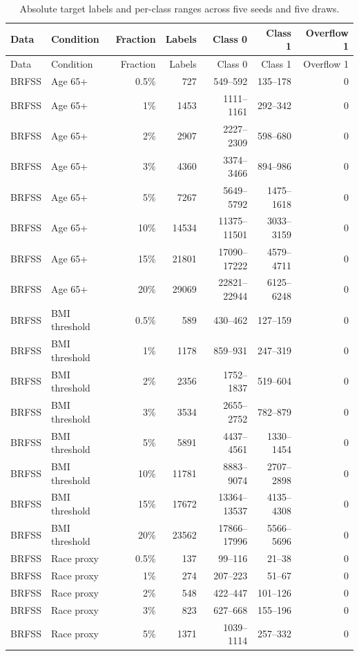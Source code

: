\begin{longtable}{llrrrrr}
\caption{Absolute target labels and per-class ranges across five seeds and five draws.}\\
\toprule Data & Condition & Fraction & Labels & Class 0 & Class 1 & Overflow 1 \\ \midrule\endfirsthead
\toprule Data & Condition & Fraction & Labels & Class 0 & Class 1 & Overflow 1 \\ \midrule\endhead
BRFSS & Age 65+ & 0.5\% & 727 & 549--592 & 135--178 & 0 \\
BRFSS & Age 65+ & 1\% & 1453 & 1111--1161 & 292--342 & 0 \\
BRFSS & Age 65+ & 2\% & 2907 & 2227--2309 & 598--680 & 0 \\
BRFSS & Age 65+ & 3\% & 4360 & 3374--3466 & 894--986 & 0 \\
BRFSS & Age 65+ & 5\% & 7267 & 5649--5792 & 1475--1618 & 0 \\
BRFSS & Age 65+ & 10\% & 14534 & 11375--11501 & 3033--3159 & 0 \\
BRFSS & Age 65+ & 15\% & 21801 & 17090--17222 & 4579--4711 & 0 \\
BRFSS & Age 65+ & 20\% & 29069 & 22821--22944 & 6125--6248 & 0 \\
BRFSS & BMI threshold & 0.5\% & 589 & 430--462 & 127--159 & 0 \\
BRFSS & BMI threshold & 1\% & 1178 & 859--931 & 247--319 & 0 \\
BRFSS & BMI threshold & 2\% & 2356 & 1752--1837 & 519--604 & 0 \\
BRFSS & BMI threshold & 3\% & 3534 & 2655--2752 & 782--879 & 0 \\
BRFSS & BMI threshold & 5\% & 5891 & 4437--4561 & 1330--1454 & 0 \\
BRFSS & BMI threshold & 10\% & 11781 & 8883--9074 & 2707--2898 & 0 \\
BRFSS & BMI threshold & 15\% & 17672 & 13364--13537 & 4135--4308 & 0 \\
BRFSS & BMI threshold & 20\% & 23562 & 17866--17996 & 5566--5696 & 0 \\
BRFSS & Race proxy & 0.5\% & 137 & 99--116 & 21--38 & 0 \\
BRFSS & Race proxy & 1\% & 274 & 207--223 & 51--67 & 0 \\
BRFSS & Race proxy & 2\% & 548 & 422--447 & 101--126 & 0 \\
BRFSS & Race proxy & 3\% & 823 & 627--668 & 155--196 & 0 \\
BRFSS & Race proxy & 5\% & 1371 & 1039--1114 & 257--332 & 0 \\

\end{longtable}
